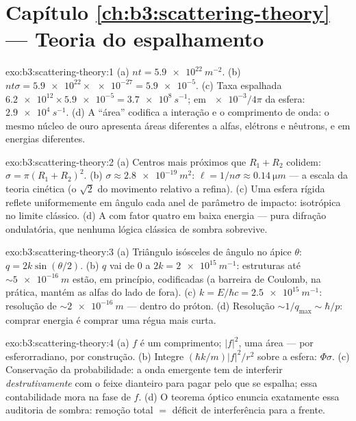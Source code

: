 \section*{Capítulo \ref{ch:b3:scattering-theory} --- Teoria do espalhamento}

\begin{solution}{exo:b3:scattering-theory:1}
(a) $nt = \qty{5.9e22}{m^{-2}}$. (b) $nt\sigma = \num{5.9e22}
\times \num{e-27} = \num{5.9e-5}$. (c) Taxa espalhada
$\num{6.2e12} \times \num{5.9e-5} = \qty{3.7e8}{s^{-1}}$; em
$\num{e-3}/4\pi$ da esfera: $\qty{2.9e4}{s^{-1}}$. (d) A ``área''
codifica a interação e o comprimento de onda: o mesmo núcleo de ouro
apresenta áreas diferentes a alfas, elétrons e nêutrons, e em energias
diferentes.
\end{solution}

\begin{solution}{exo:b3:scattering-theory:2}
(a) Centros mais próximos que $R_1 + R_2$ colidem: $\sigma = \pi(R_1 +
R_2)^2$. (b) $\sigma \approx \qty{2.8e-19}{m^2}$: $\ell = 1/n\sigma
\approx \qty{0.14}{\micro m}$ --- a escala da teoria cinética (o
$\sqrt2$ do movimento relativo a refina). (c) Uma esfera rígida reflete
uniformemente em ângulo cada anel de parâmetro de impacto: isotrópica
no limite clássico. (d) A  com fator quatro em baixa
energia --- pura difração ondulatória, que nenhuma lógica clássica de
sombra sobrevive.
\end{solution}

\begin{solution}{exo:b3:scattering-theory:3}
(a) Triângulo isósceles de ângulo no ápice $\theta$: $q =
2k\sin(\theta/2)$. (b) $q$ vai de $0$ a $2k = \qty{2e15}{
m^{-1}}$: estruturas até $\sim\qty{5e-16}{m}$ estão, em princípio,
codificadas (a barreira de Coulomb, na prática, mantém as alfas do lado
de fora). (c) $k = E/\hbar c = \qty{2.5e15}{m^{-1}}$: resolução de
$\sim\qty{2e-16}{m}$ --- dentro do próton. (d) Resolução
$\sim 1/q_{\max} \sim \hbar/p$: comprar energia é comprar uma régua
mais curta.
\end{solution}

\begin{solution}{exo:b3:scattering-theory:4}
(a) $f$ é um comprimento; $|f|^2$, uma área --- por esferorradiano, por
construção. (b) Integre $(\hbar k/m)|f|^2/r^2$ sobre a esfera:
$\Phi\sigma$. (c) Conservação da probabilidade: a onda emergente tem de
interferir \emph{destrutivamente} com o feixe dianteiro para pagar pelo
que se espalha; essa contabilidade mora na fase de $f$. (d) O teorema
óptico enuncia exatamente essa auditoria de sombra: remoção total $=$
déficit de interferência para a frente.
\end{solution}

